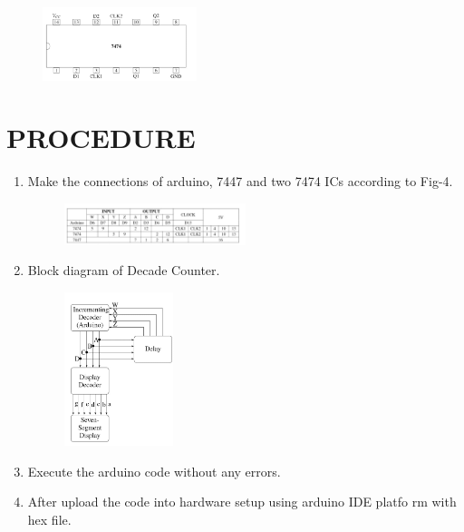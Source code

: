\documentclass[conference]{IEEEtran}
\begin{document}
\begin{figure}[h]
\centering
\includegraphics[width=0.4\textwidth]{7474.jpg}
\caption{\label{fig-3:Gates}}
\end{figure}
\section{PROCEDURE}


\begin{enumerate}

\item Make the connections of arduino, 7447 and two 7474 ICs according to Fig-4.
        \begin{figure}[h]
        \centering
		\includegraphics[width=0.5\textwidth]{connections.jpg}
        \caption{\label{fig-4:Gates}}
\end{figure}

\item Block diagram of Decade Counter.
                                                                        \begin{figure}[h]
\centering
\includegraphics[width=0.3\textwidth]{decoder.jpg}
\caption{\label{fig-5:Gates}}
\end{figure}
                                                                        

\item Execute the arduino code without any errors.
\item After upload the code into hardware setup using arduino IDE platfo
rm with hex file.
 \end{enumerate}
\end{document}
